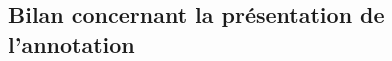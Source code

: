 		
	
	
	\subsection{Bilan concernant la présentation de l'annotation}
	\label{section:2.1.3-PRESENTATION-ANNOTATION-BILAN}
	
